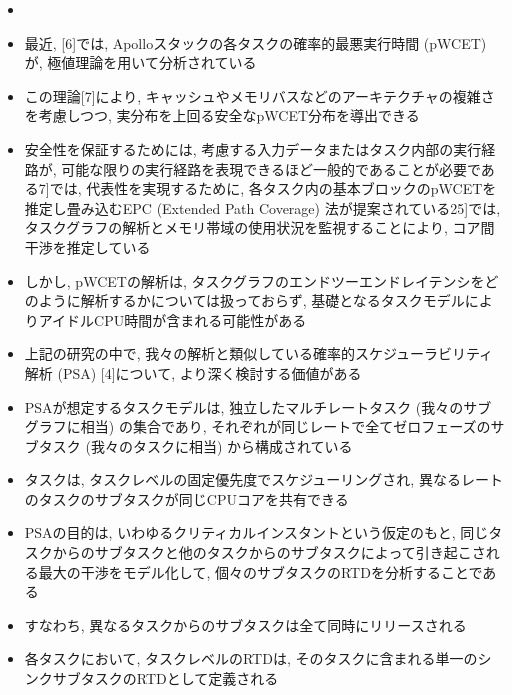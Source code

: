 \begin{frame}{}
    \begin{itemize}
        \item 
\item 最近, [6]では, Apolloスタックの各タスクの確率的最悪実行時間 (pWCET) が, 極値理論を用いて分析されている
\item この理論[7]により, キャッシュやメモリバスなどのアーキテクチャの複雑さを考慮しつつ, 実分布を上回る安全なpWCET分布を導出できる
\item 安全性を保証するためには, 考慮する入力データまたはタスク内部の実行経路が, 可能な限りの実行経路を表現できるほど一般的であることが必要である7]では, 代表性を実現するために, 各タスク内の基本ブロックのpWCETを推定し畳み込むEPC (Extended Path Coverage) 法が提案されている25]では, タスクグラフの解析とメモリ帯域の使用状況を監視することにより, コア間干渉を推定している
\item しかし, pWCETの解析は, タスクグラフのエンドツーエンドレイテンシをどのように解析するかについては扱っておらず, 基礎となるタスクモデルによりアイドルCPU時間が含まれる可能性がある
    \end{itemize}
\end{frame}

\begin{frame}{}
    \begin{itemize}
        \item 上記の研究の中で, 我々の解析と類似している確率的スケジューラビリティ解析 (PSA) [4]について, より深く検討する価値がある
\item PSAが想定するタスクモデルは, 独立したマルチレートタスク (我々のサブグラフに相当) の集合であり, それぞれが同じレートで全てゼロフェーズのサブタスク (我々のタスクに相当) から構成されている
\item タスクは, タスクレベルの固定優先度でスケジューリングされ, 異なるレートのタスクのサブタスクが同じCPUコアを共有できる
\item PSAの目的は, いわゆるクリティカルインスタントという仮定のもと, 同じタスクからのサブタスクと他のタスクからのサブタスクによって引き起こされる最大の干渉をモデル化して, 個々のサブタスクのRTDを分析することである
\item すなわち, 異なるタスクからのサブタスクは全て同時にリリースされる
\item 各タスクにおいて, タスクレベルのRTDは, そのタスクに含まれる単一のシンクサブタスクのRTDとして定義される
    \end{itemize}
\end{frame}

